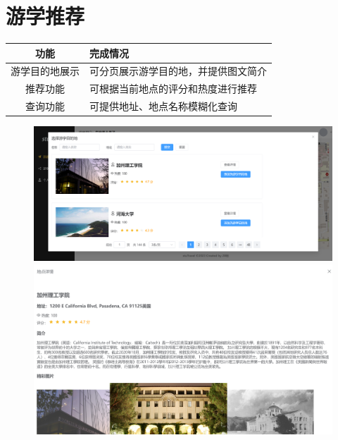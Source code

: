 \documentclass{report}
\begin{document}
\section{游学推荐}
\begin{table}[!ht]
    \centering
    \begin{tabularx}{\textwidth}{|c|X|}
    \hline
        \textbf{功能} & \textbf{完成情况} \\ \hline
        游学目的地展示 & 可分页展示游学目的地，并提供图文简介 \\ \hline
        推荐功能 & 可根据当前地点的评分和热度进行推荐 \\ \hline
        查询功能 & 可提供地址、地点名称模糊化查询 \\ \hline
    \end{tabularx}
\end{table}
\begin{figure}[!ht]
    \begin{center}
        \includegraphics*[width=\textwidth]{figure/2.2.png}
    \end{center}
    \begin{center}
        \includegraphics*[width=\textwidth]{figure/2.2-dt.png}
    \end{center}
    \begin{center}

\end{center}
\end{figure}
\end{document}

